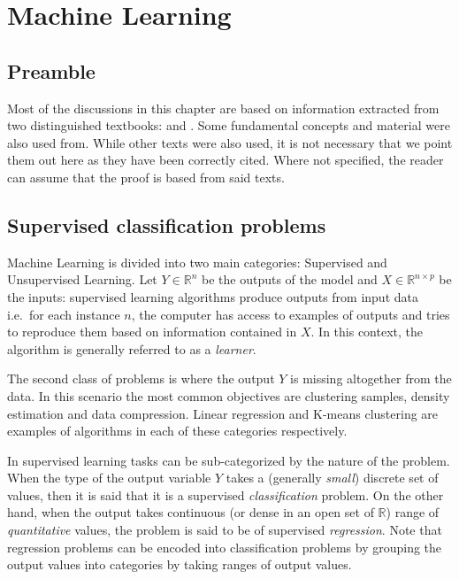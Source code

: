 \chapter{Machine Learning}
\label{ch:machineLearning}

\section{Preamble}\label{section-preamble}
Most of the discussions in this chapter are based on information extracted from two distinguished textbooks: \textcite{bishop-patternRecognition} and \textcite{hastie-elemstatslearn}. Some fundamental concepts and material were also used from\label{scikit-learn}. While other texts were also used, it is not necessary that we point them out here as they have been correctly cited. Where not specified, the reader can assume that the proof is based from said texts.


\section{ Supervised classification problems}\label{section-supervised-learning}


Machine Learning is divided into two main categories: Supervised and Unsupervised Learning. Let $Y \in \mathbb{R}^n$ be the outputs of the model and $X \in \mathbb{R}^{n \times p}$ be the inputs: supervised learning algorithms produce outputs from input data i.e.\ for each instance $n$, the computer has access to examples of outputs and tries to reproduce them based on information contained in $X$. In this context, the algorithm is generally referred to as a \textit{learner}.

The second class of problems is where the output $Y$ is missing altogether from the data. In this scenario the most common objectives are clustering samples, density estimation and data compression. Linear regression and K-means clustering are examples of algorithms in each of these categories respectively.


In supervised learning tasks can be sub-categorized by the nature of the problem. When the type of the output variable $Y$ takes a (generally \textit{small}) discrete set of values, then it is said that it is a supervised \textit{classification} problem. On the other hand, when the output takes continuous (or dense in an open set of $\mathbb{R}$) range of \textit{quantitative} values, the problem is said to be of supervised \textit{regression}. Note that regression problems can be encoded into classification problems by grouping the output values into categories by taking ranges of output values.

